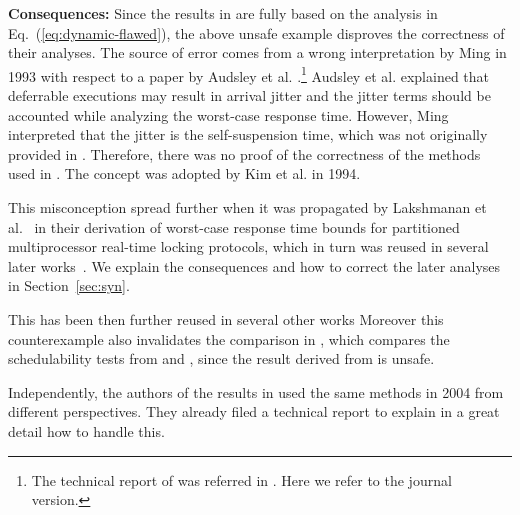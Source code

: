 
{\bf Consequences:} Since the results in \cite{ECRTS-AudsleyB04,RTAS-AudsleyB04,RTCSA-KimCPKH95,MingLiRTCSA1994} are fully based on the analysis in Eq.~(\ref{eq:dynamic-flawed}), the above unsafe example disproves the correctness of their analyses. The source of error comes from a wrong interpretation by Ming \cite{MingLiRTCSA1994} in 1993 with respect to a paper by Audsley et al. \cite{audsley-1993}.\footnote{The technical report of \cite{audsley-1993} was referred in \cite{MingLiRTCSA1994}. Here we refer to the journal version.} Audsley et al. \cite{audsley-1993} explained that deferrable executions may result in arrival jitter and the jitter terms should be accounted while analyzing the worst-case response time. However, Ming \cite{MingLiRTCSA1994} interpreted that the jitter is the self-suspension time, which was not originally provided in \cite{audsley-1993}. Therefore, there was no proof of the correctness of the methods used in \cite{MingLiRTCSA1994}. The concept was adopted by Kim et al. \cite{RTCSA-KimCPKH95} in 1994. 

This misconception spread further when it was propagated by Lakshmanan et al.~\cite{lakshmanan-2009} in their derivation of worst-case response time bounds for
partitioned multiprocessor real-time locking protocols, which in turn was reused in several later works~\cite{zeng-2011,bbb-2013,yang-2013,kim-2014,han-2014,carminati-2014,yang-2014}. We explain the consequences and how to correct the later analyses in Section~\ref{sec:syn}. 

 This has been then further reused in several other works 
Moreover this counterexample also invalidates the comparison in \cite{RidouardR06}, which compares the schedulability tests from \cite{RTCSA-KimCPKH95} and \cite[Page 164-165]{Liu:2000:RS:518501}, since the result derived from \cite{RTCSA-KimCPKH95} is unsafe.

Independently, the authors of the results in \cite{ECRTS-AudsleyB04,RTAS-AudsleyB04} used the same methods in 2004 from different perspectives. They already filed a technical report \cite{BletsasReport2015} to explain in a great detail how to handle this. 

